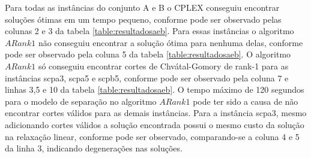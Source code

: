 Para todas as instâncias do conjunto A e B o CPLEX conseguiu encontrar soluções ótimas em um tempo pequeno, conforme
pode ser observado pelas colunas 2 e 3 da tabela \ref{table:resultadosaeb}. Para essas instâncias o algoritmo {$ARank1$}
não conseguiu encontrar a solução ótima para nenhuma delas, conforme pode ser observado pela coluna 5 da 
tabela \ref{table:resultadosaeb}. O algoritmo {$ARank1$} só conseguiu encontrar cortes de Chvátal-Gomory de rank-1 
para as instâncias scpa3, scpa5 e scpb5, conforme pode ser observado pela coluna 7 e linhas 3,5 e 10 da 
tabela \ref{table:resultadosaeb}. O tempo máximo de 120 segundos para o modelo de separação no algoritmo {$ARank1$}
pode ter sido a causa de não encontrar cortes válidos para as demais instâncias. Para a instância scpa3, mesmo
adicionando cortes válidos a solução encontrada possui o mesmo custo da solução na relaxação linear, conforme pode 
ser observado, comparando-se a coluna 4 e 5 da linha 3, indicando degenerações nas soluções.

